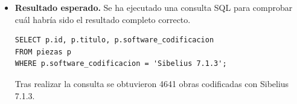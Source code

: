 \begin{itemize}
*   **Fáinne Geal an Lae** (Autor: 1/1a K, Compás: 2/2, Tonalidad: E minor)
*   **An Clár Bog Déil** (Autor: 1/4a K, Compás: 3/4, Tonalidad: D major)
*   **Reel** (Autor: 1/42b K, Compás: 2/2, Tonalidad: G major)
*   **Miss Monaghan’s Reel** (Autor: 1/42c K, Compás: 2/2, Tonalidad: D major)
*   **Betsy Baker** (Autor: 1/43a K, Compás: 2/2, Tonalidad: E minor)
*   **Miss Johnson** (Autor: 1/43b K, Compás: 2/2, Tonalidad: G major)
*   **The Wind that Shakes the Barley** (Autor: 1/43c K, Compás: 2/2, Tonalidad: D major)
*   **Reel** (Autor: 1/44a K, Compás: 2/2, Tonalidad: G major)
*   **Reel** (Autor: 1/44b K, Compás: 2/2, Tonalidad: G major)
*   **The Lady’s Cup of Tea** (Autor: 1/44c K, Compás: 2/2, Tonalidad: C major)"
\item \textbf{Resultado esperado.} Se ha ejecutado una consulta SQL para comprobar cuál habría sido el resultado completo correcto.
    \begin{verbatim}
SELECT p.id, p.titulo, p.software_codificacion
FROM piezas p
WHERE p.software_codificacion = 'Sibelius 7.1.3';
    \end{verbatim}    
    Tras realizar la consulta se obtuvieron 4641 obras codificadas con Sibelius 7.1.3.

\end{itemize}

